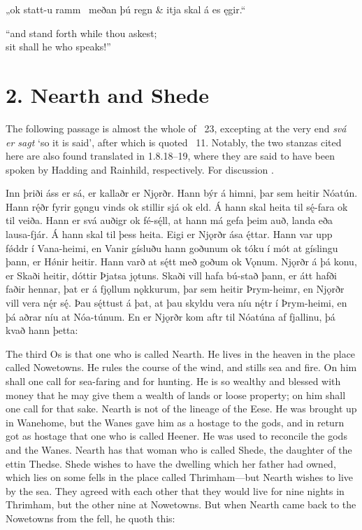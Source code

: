\bvg\bva[][10]„ok statt-u ramm \hld\ meðan þú regn &
\ind {}itja skal á es ęgir.“\eva

\bvb “and stand forth while thou askest; \\
\ind sit shall he who speaks!”\evb\evg

\sectionline

\section{2. Nearth and Shede}

The following passage is almost the whole of \Gylfaginning\ 23, excepting at the very end \emph{svá er sagt} ‘so it is said’, after which is quoted \Grimnismal\ 11.
Notably, the two stanzas cited here are also found translated in \textcite{Saxo} 1.8.18–19, where they are said to have been spoken by Hadding and Rainhild, respectively.  For discussion \textcite{Hopkins2021}.

\sectionline

\bpg\bpa[0]Inn þriði áss er sá, er kallaðr er Njǫrðr. Hann býr á himni, þar sem heitir Nóatún. Hann rę́ðr fyrir gǫngu vinds ok stillir sjá ok eld. Á hann skal heita til sę́-fara ok til veiða. Hann er svá auðigr ok fé-sę́ll, at hann má gefa þeim auð, landa eða lausa-fjár. Á hann skal til þess heita. Eigi er Njǫrðr ása ę́ttar. Hann var upp fǿddr í Vana-heimi, en Vanir gísluðu hann goðunum ok tóku í mót at gíslingu þann, er Hǿnir heitir. Hann varð at sę́tt með goðum ok Vǫnum. Njǫrðr á þá konu, er Skaði heitir, dóttir Þjatsa jǫtuns. Skaði vill hafa bú-stað þann, er átt hafði faðir hennar, þat er á fjǫllum nǫkkurum, þar sem heitir Þrym-heimr, en Njǫrðr vill vera nę́r sę́. Þau sę́ttust á þat, at þau skyldu vera níu nę́tr í Þrym-heimi, en þá aðrar níu at Nóa-túnum. En er Njǫrðr kom aftr til Nóatúna af fjallinu, þá kvað hann þetta:\epa

\bpb The third Os is that one who is called Nearth. He lives in the heaven in the place called Nowetowns. He rules the course of the wind, and stills sea and fire. On him shall one call for sea-faring and for hunting. He is so wealthy and blessed with money that he may give them a wealth of lands or loose property; on him shall one call for that sake. Nearth is not of the lineage of the Eese. He was brought up in Wanehome, but the Wanes gave him as a hostage to the gods, and in return got as hostage that one who is called Heener. He was used to reconcile the gods and the Wanes. Nearth has that woman who is called Shede, the daughter of the ettin Thedse. Shede wishes to have the dwelling which her father had owned, which lies on some fells in the place called Thrimham—but Nearth wishes to live by the sea. They agreed with each other that they would live for nine nights in Thrimham, but the other nine at Nowetowns. But when Nearth came back to the Nowetowns from the fell, he quoth this:\epb\epg

